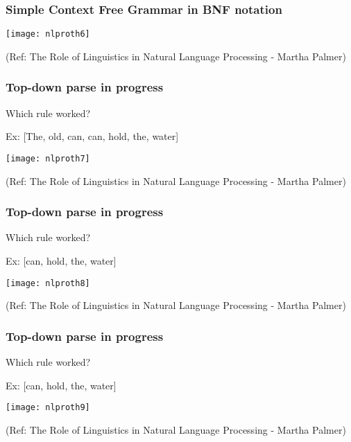 \begin{frame}[fragile]
  \frametitle{Simple Context Free Grammar in BNF 
notation}
  \begin{center}
\texttt{[image: nlproth6]}
\end{center}



(Ref: The Role of Linguistics in  Natural Language Processing - 
Martha Palmer)
 \end{frame}
 
\begin{frame}[fragile]
  \frametitle{Top-down parse in progress}
Which rule worked?

Ex: [The, old, can, can, hold, the, water]

  \begin{center}
\texttt{[image: nlproth7]}
\end{center}

(Ref: The Role of Linguistics in  Natural Language Processing - 
Martha Palmer)
 \end{frame}
 
 
\begin{frame}[fragile]
  \frametitle{Top-down parse in progress}
Which rule worked?

Ex: [can, hold, the, water]

  \begin{center}
\texttt{[image: nlproth8]}
\end{center}

(Ref: The Role of Linguistics in  Natural Language Processing - 
Martha Palmer)
 \end{frame}
 
  
\begin{frame}[fragile]
  \frametitle{Top-down parse in progress}
Which rule worked?

Ex: [can, hold, the, water]

  \begin{center}
\texttt{[image: nlproth9]}
\end{center}

(Ref: The Role of Linguistics in  Natural Language Processing - 
Martha Palmer)
 \end{frame}
 
